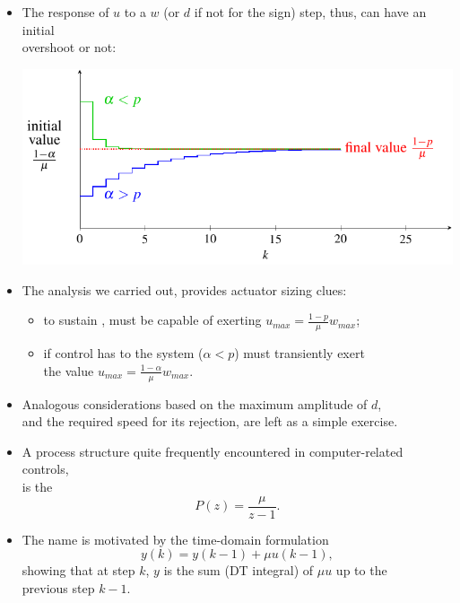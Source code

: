 \begin{frame}
\myPause
 \begin{itemize}[<+-| alert@+>]
 \item The response of $u$ to a $w$ (or $d$ if not for the sign) step, thus, can have an initial\\
       overshoot or not:
       \begin{center}
        \includegraphics[width=0.55\columnwidth]{./Unit-06/img/ControlStepResponses-1.pdf}
       \end{center}
 \item The analysis we carried out, provides  actuator sizing clues:
       \begin{itemize}[<+-| alert@+>]
       \item to sustain , must be capable of exerting $u_{max}=\frac{1-p}{\mu} w_{max}$;
       \item if control has to  the system ($\alpha<p$) must transiently exert\\
             the  value $u_{max}=\frac{1-\alpha}{\mu} w_{max}$.
       \end{itemize}
 \item Analogous considerations based on the maximum amplitude of $d$,\\
       and the required speed for its rejection, are left as a simple exercise.
 \end{itemize}
\end{frame}

\begin{frame}
\myPause
 \begin{itemize}[<+-| alert@+>]
 \item A process structure quite frequently encountered in computer-related controls,\\
       is the 
       \begin{displaymath}
        P(z) = \frac{\mu}{z-1}.
       \end{displaymath}
 \item The name is motivated by the time-domain formulation
       \begin{displaymath}
        y(k) = y(k-1) + \mu u(k-1),
       \end{displaymath}
       showing that at step $k$, $y$ is the sum (DT integral) of $\mu u$ up to the\\
       previous step $k-1$.
 \end{itemize}
\end{frame}

